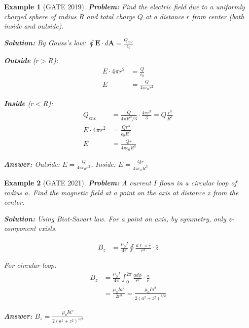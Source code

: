 \documentclass[12pt,a4paper]{article}
\newtheorem{example}{Example}[section]
\newcommand{\ans}[1]{\textcolor{red!70!black}{\textbf{Answer:} #1}}
\newcommand{\sol}{\textcolor{blue!70!black}{\textbf{Solution:}}}
\begin{document}
\begin{example}[GATE 2019]
\textbf{Problem:} Find the electric field due to a uniformly charged sphere of radius $R$ and total charge $Q$ at a distance $r$ from center (both inside and outside).

\sol
By Gauss's law: $\oint \mathbf{E} \cdot d\mathbf{A} = \frac{Q_{enc}}{\epsilon_0}$

\textbf{Outside} ($r > R$):
\begin{align}
E \cdot 4\pi r^2 &= \frac{Q}{\epsilon_0}\\
E &= \frac{Q}{4\pi\epsilon_0 r^2}
\end{align}

\textbf{Inside} ($r < R$):
\begin{align}
Q_{enc} &= \frac{Q}{4\pi R^3/3} \cdot \frac{4\pi r^3}{3} = Q\frac{r^3}{R^3}\\
E \cdot 4\pi r^2 &= \frac{Q r^3}{\epsilon_0 R^3}\\
E &= \frac{Qr}{4\pi\epsilon_0 R^3}
\end{align}

\ans{Outside: $E = \frac{Q}{4\pi\epsilon_0 r^2}$, Inside: $E = \frac{Qr}{4\pi\epsilon_0 R^3}$}
\end{example}

\begin{example}[GATE 2021]
\textbf{Problem:} A current $I$ flows in a circular loop of radius $a$. Find the magnetic field at a point on the axis at distance $z$ from the center.

\sol
Using Biot-Savart law. For a point on axis, by symmetry, only $z$-component exists.

\begin{align}
B_z &= \frac{\mu_0 I}{4\pi} \oint \frac{d\ell \times \hat{r}}{r^2} \cdot \hat{z}
\end{align}

For circular loop:
\begin{align}
B_z &= \frac{\mu_0 I}{4\pi} \int_0^{2\pi} \frac{a d\phi}{r^2} \cdot \frac{a}{r}\\
&= \frac{\mu_0 I a^2}{2r^3} = \frac{\mu_0 I a^2}{2(a^2 + z^2)^{3/2}}
\end{align}

\ans{$B_z = \frac{\mu_0 I a^2}{2(a^2 + z^2)^{3/2}}$}
\end{example}
\end{document}
